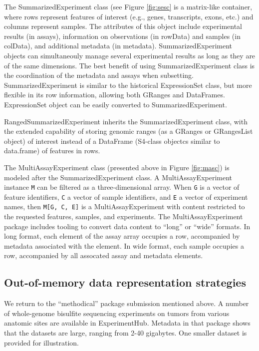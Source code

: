 The SummarizedExperiment class (see Figure \ref{fig:sesc} is a matrix-like container, where rows represent features of interest (e.g., genes, transcripts, exons, etc.) and columns represent samples. The attributes of this object include experimental results (in assays), information on observations (in rowData) and samples (in colData), and additional metadata (in metadata). SummarizedExperiment objects can simultaneouly manage several experimental results as long as they are of the same dimensions. The best benefit of using SummarizedExperiment class is the coordination of the metadata and assays when subsetting. SummarizedExperiment is similar to the historical ExpressionSet class, but more flexible in its row information, allowing both GRanges and DataFrames. ExpressionSet object can be easily converted to SummarizedExperiment.

RangedSummarizedExperiment inherits the SummarizedExperiment class, with the extended capability of storing genomic ranges (as a GRanges or GRangesList object) of interest instead of a DataFrame (S4-class objectcs similar to data.frame) of features in rows.

The MultiAssayExperiment class (presented above in
Figure \ref{fig:masc}) is modeled after the SummarizedExperiment class.
A MultiAssayExperiment instance \texttt{M} can be
filtered as a three-dimensional array.
When \texttt{G} is a vector of feature identifiers,
\texttt{C} a vector of sample identifiers, and \texttt{E} a
vector of experiment names, then \texttt{M{[}G, C, E{]}} is
a MultiAssayExperiment with content restricted to the
requested features, samples, and experiments. The MultiAssayExperiment
package includes tooling to convert data content to ``long'' or
``wide'' formats. In long format, each element of the assay array occupies
a row, accompanied by metadata associated with the element.
In wide format, each sample occupies a row, accompanied by all
assocated assay and metadata elements.

\hypertarget{out-of-memory-data-representation-strategies}{%
\subsection{Out-of-memory data representation strategies}\label{out-of-memory-data-representation-strategies}}

We return to the ``methodical'' package
submission mentioned above.
A number of whole-genome bisulfite sequencing experiments on
tumors from various anatomic sites are available
in ExperimentHub.
Metadata in that package shows that the datasets
are large, ranging from 2-40 gigabytes. One smaller
dataset is provided for illustration.

